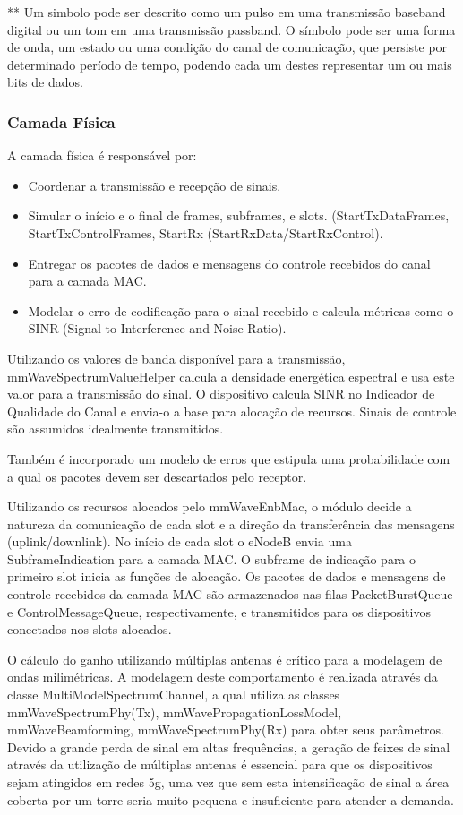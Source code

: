 \documentclass{article}
\begin{document}
** Um simbolo pode ser descrito como um pulso em uma transmissão baseband digital ou um tom em uma transmissão passband. O símbolo pode ser uma forma de onda, um estado ou uma condição do canal de comunicação, que persiste por determinado período de tempo, podendo cada um destes representar um ou mais bits de dados.

\subsubsection{Camada Física}

A camada física é responsável por:
\begin{itemize}
\item Coordenar a transmissão e recepção de sinais.
\item Simular o início e o final de frames, subframes, e slots. (StartTxDataFrames, StartTxControlFrames, StartRx (StartRxData/StartRxControl).
\item Entregar os pacotes de dados e mensagens do controle recebidos do canal para a camada MAC.
\item Modelar o erro de codificação para o sinal recebido e calcula métricas como o SINR (Signal to Interference and Noise Ratio).
\end{itemize}

Utilizando os valores de banda disponível para a transmissão, mmWaveSpectrumValueHelper calcula a densidade energética espectral e usa este valor para a transmissão do sinal. O dispositivo calcula SINR no Indicador de Qualidade do Canal e envia-o a base para alocação de recursos. Sinais de controle são assumidos idealmente transmitidos. 

Também é incorporado um modelo de erros que estipula uma probabilidade com a qual os pacotes devem ser descartados pelo receptor. 

Utilizando os recursos alocados pelo mmWaveEnbMac, o módulo decide a natureza da comunicação de cada slot e a direção da transferência das mensagens (uplink/downlink). No início de cada slot o eNodeB envia uma SubframeIndication para a camada MAC. O subframe de indicação para o primeiro slot inicia as funções de alocação. Os pacotes de dados e mensagens de controle recebidos da camada MAC são armazenados nas filas PacketBurstQueue e ControlMessageQueue, respectivamente, e transmitidos para os dispositivos conectados nos slots alocados.

O cálculo do ganho utilizando múltiplas antenas é crítico para a modelagem de ondas milimétricas. A modelagem deste comportamento é realizada através da classe MultiModelSpectrumChannel, a qual utiliza as classes mmWaveSpectrumPhy(Tx), mmWavePropagationLossModel, mmWaveBeamforming, mmWaveSpectrumPhy(Rx) para obter seus parâmetros. Devido a grande perda de sinal em altas frequências, a geração de feixes de sinal através da utilização de múltiplas antenas é essencial para que os dispositivos sejam atingidos em redes 5g, uma vez que sem esta intensificação de sinal a área coberta por um torre seria muito pequena e insuficiente para atender a demanda.
\end{document}
